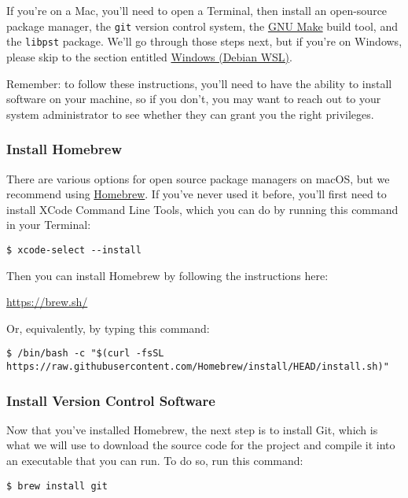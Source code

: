 \documentclass[11pt]{article}
\begin{document}
If you're on a Mac, you'll need to open a Terminal, then install an
open-source package manager, the \texttt{git} version control system, the \href{https://www.gnu.org/software/make/}{GNU
Make} build tool, and the \texttt{libpst} package.  We'll go through those
steps next, but if you're on Windows, please skip to the section
entitled \hyperref[org5a48eb5]{Windows (Debian WSL)}.

Remember: to follow these instructions, you'll need to have the
ability to install software on your machine, so if you don't, you may
want to reach out to your system administrator to see whether they can
grant you the right privileges.

\subsubsection*{Install Homebrew}
\label{sec:org60e9205}

There are various options for open source package managers on macOS,
but we recommend using \href{https://brew.sh}{Homebrew}.  If you've never used it
before, you'll first need to install XCode Command Line Tools, which
you can do by running this command in your Terminal:

\begin{verbatim}
$ xcode-select --install
\end{verbatim}

Then you can install Homebrew by following the instructions here:

\url{https://brew.sh/}

Or, equivalently, by typing this command:

\footnotesize

\begin{verbatim}
$ /bin/bash -c "$(curl -fsSL https://raw.githubusercontent.com/Homebrew/install/HEAD/install.sh)"
\end{verbatim}

\normalsize

\subsubsection*{Install Version Control Software}
\label{sec:org0e5540e}

Now that you've installed Homebrew, the next step is to install Git,
which is what we will use to download the source code for the project
and compile it into an executable that you can run.  To do so, run
this command:

\begin{verbatim}
$ brew install git
\end{verbatim}
\end{document}
